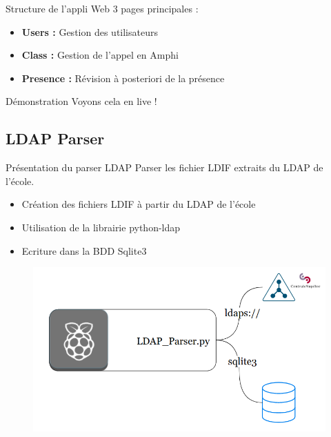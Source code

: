\documentclass[aspectratio=169]{beamer}
\begin{document}
\begin{frame}{Structure de l'appli Web}
  3 pages principales :
  \begin{itemize}
    \item \textbf{Users :} Gestion des utilisateurs
    \item \textbf{Class :} Gestion de l'appel en Amphi
    \item \textbf{Presence :} Révision à posteriori de la présence
  \end{itemize}
\end{frame}

\begin{frame}{Démonstration}
  Voyons cela en live !
\end{frame}

\subsection{LDAP Parser}

\begin{frame}{Présentation du parser LDAP}
    Parser les fichier LDIF extraits du LDAP de l'école.
    \begin{itemize}
        \item Création des fichiers LDIF à partir du LDAP de l'école
        \item Utilisation de la librairie python-ldap
        \item Ecriture dans la BDD Sqlite3
    \end{itemize}
    \begin{figure}
        \centering
        \includegraphics[width=.45\textwidth]{../assets/ldapparserarchitecture.png}
    \end{figure}
\end{frame}
\end{document}
